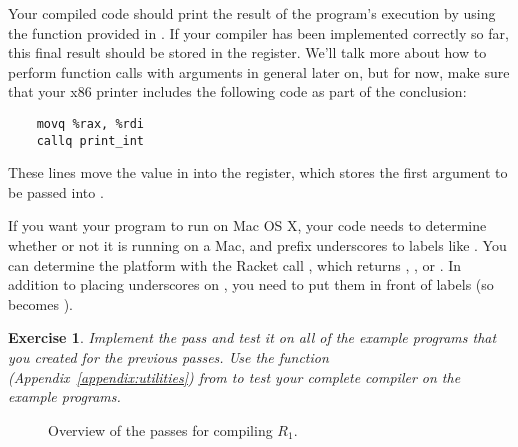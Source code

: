 \documentclass[11pt]{book}
\newtheorem{exercise}[theorem]{Exercise}
\begin{document}
Your compiled code should print the result of the program's execution by using the
 function provided in . If your compiler has been implemented correctly so far, this final result should be stored in the  register.
We'll talk more about
how to perform function calls with arguments in general later on, but
for now, make sure that your x86 printer includes the following code as part of the conclusion:

\begin{lstlisting}
    movq %rax, %rdi
    callq print_int
\end{lstlisting}

These lines move the value in  into the  register, which
stores the first argument to be passed into .

If you want your program to run on Mac OS X, your code needs to
determine whether or not it is running on a Mac, and prefix
underscores to labels like .  You can determine the platform
with the Racket call , which returns
, , or .  In addition to
placing underscores on , you need to put them in front of
 labels (so  becomes ).

\begin{exercise}
\normalfont Implement the  pass and test it on all of
the example programs that you created for the previous passes. Use the
 function (Appendix~\ref{appendix:utilities}) from
 to test your complete compiler on the example
programs.
\end{exercise}

\begin{figure}[p]

\caption{Overview of the passes for compiling $R_1$. }
\label{fig:R1-passes}
\end{figure}
\end{document}
